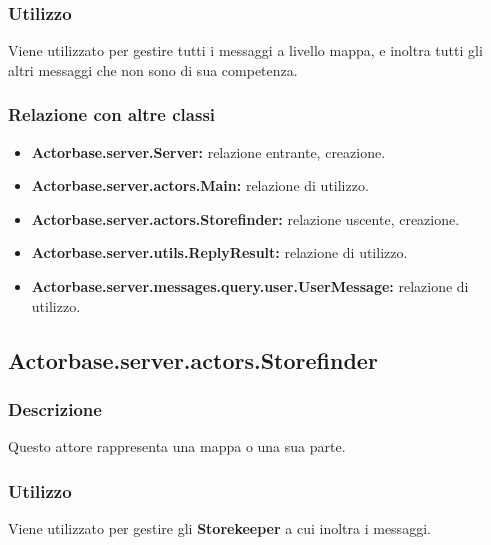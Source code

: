 \documentclass[a4paper]{article}
\begin{document}
			\subsubsection{Utilizzo}
				Viene utilizzato per gestire tutti i messaggi a livello mappa, e inoltra tutti gli altri messaggi che non sono di sua competenza.
				
			\subsubsection{Relazione con altre classi}
				\begin{itemize}
					\item \textbf{Actorbase.server.Server:} relazione entrante, creazione.
					\item \textbf{Actorbase.server.actors.Main:} relazione di utilizzo.
					\item \textbf{Actorbase.server.actors.Storefinder:} relazione uscente, creazione.
					\item \textbf{Actorbase.server.utils.ReplyResult:} relazione di utilizzo.
					\item \textbf{Actorbase.server.messages.query.user.UserMessage:} relazione di utilizzo.
				\end{itemize}
				
		\subsection{Actorbase.server.actors.Storefinder}
			\subsubsection{Descrizione}
				Questo attore rappresenta una mappa o una sua parte.
				
			\subsubsection{Utilizzo}
				Viene utilizzato per gestire gli \textbf{Storekeeper} a cui inoltra i messaggi.
				
\end{document}
